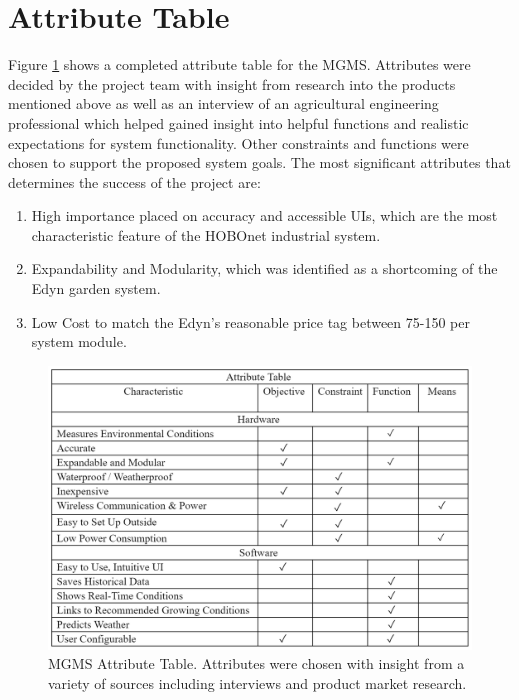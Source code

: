 \documentclass{report}
\begin{document}
\section{Attribute Table}
Figure \ref{fig:attribute} shows a completed attribute table for the MGMS. Attributes were decided by the project team with insight from research into the products mentioned above as well as an interview of an agricultural engineering professional which helped gained insight into helpful functions and realistic expectations for system functionality. Other constraints and functions were chosen to support the proposed system goals. The most significant attributes that determines the success of the project are:

\begin{enumerate}[label=\alph*.]
    \item
          High importance placed on accuracy and accessible UIs, which are the most characteristic feature of the HOBOnet industrial system.
    \item
          Expandability and Modularity, which was identified as a shortcoming of the Edyn garden system.
    \item
          Low Cost to match the Edyn’s reasonable price tag between 75-150 per system module.\\
\end{enumerate}

\vspace{-13pt}
\begin{figure}[H]
    \centering
    \includegraphics[width=0.8\linewidth]{PNGs/AttributeTable.PNG}
    \caption{MGMS Attribute Table. Attributes were chosen with insight from a variety of sources including interviews and product market research.}
    \label{fig:attribute}
\end{figure}
\end{document}
